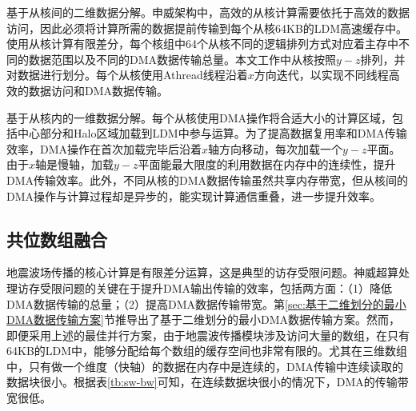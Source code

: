 \documentclass[degree=doctor]{thuthesis}
\begin{document}
基于从核间的二维数据分解。申威架构中，高效的从核计算需要依托于高效的数据访问，因此必须将计算所需的数据提前传输到每个从核64KB的LDM高速缓存中。使用从核计算有限差分，每个核组中64个从核不同的逻辑排列方式对应着主存中不同的数据范围以及不同的DMA数据传输总量。本文工作中从核按照$y-z$排列，并对数据进行划分。每个从核使用Athread线程沿着$ x $方向迭代，以实现不同线程高效的数据访问和DMA数据传输。

基于从核内的一维数据分解。每个从核使用DMA操作将合适大小的计算区域，包括中心部分和Halo区域加载到LDM中参与运算。为了提高数据复用率和DMA传输效率，DMA操作在首次加载完毕后沿着$x$轴方向移动，每次加载一个$y-z$平面。由于$x$轴是慢轴，加载$y-z$平面能最大限度的利用数据在内存中的连续性，提升DMA传输效率。此外，不同从核的DMA数据传输虽然共享内存带宽，但从核间的DMA操作与计算过程却是异步的，能实现计算通信重叠，进一步提升效率。

\subsection{共位数组融合}
\label{sub:共位数组融合}
地震波场传播的核心计算是有限差分运算，这是典型的访存受限问题。神威超算处理访存受限问题的关键在于提升DMA输出传输的效率，包括两方面：（1）降低DMA数据传输的总量；（2）提高DMA数据传输带宽。第\ref{sec:基于二维划分的最小DMA数据传输方案}节推导出了基于二维划分的最小DMA数据传输方案。然而，即便采用上述的最佳并行方案，由于地震波传播模块涉及访问大量的数组，在只有64KB的LDM中，能够分配给每个数组的缓存空间也非常有限的。尤其在三维数组中，只有做一个维度（快轴）的数据在内存中是连续的，DMA传输中连续读取的数据块很小。根据表\ref{tb:sw-bw}可知，在连续数据块很小的情况下，DMA的传输带宽很低。
\end{document}
